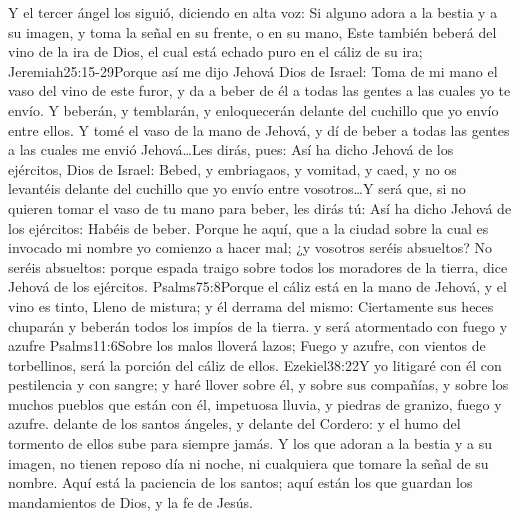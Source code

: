 Y el tercer ángel los siguió, diciendo en alta voz: Si alguno adora a la bestia y a su imagen, y toma la señal en su frente, o en su mano, 
Este también beberá del vino de la ira de Dios, el cual está echado puro en el cáliz de su ira;%
				   {Jeremiah}{25:15-29}{Porque así me dijo Jehová Dios de Israel: Toma de mi mano el vaso del vino de este furor, y da a beber de él a todas las gentes a las cuales yo te envío. Y beberán, y temblarán, y enloquecerán delante del cuchillo que yo envío entre ellos. Y tomé el vaso de la mano de Jehová, y dí de beber a todas las gentes a las cuales me envió Jehová\ldots Les dirás, pues: Así ha dicho Jehová de los ejércitos, Dios de Israel: Bebed, y embriagaos, y vomitad, y caed, y no os levantéis delante del cuchillo que yo envío entre vosotros\ldots Y será que, si no quieren tomar el vaso de tu mano para beber, les dirás tú: Así ha dicho Jehová de los ejércitos: Habéis de beber. Porque he aquí, que a la ciudad sobre la cual es invocado mi nombre yo comienzo a hacer mal; ¿y vosotros seréis absueltos? No seréis absueltos: porque espada traigo sobre todos los moradores de la tierra, dice Jehová de los ejércitos.}%
				   {Psalms}{75:8}{Porque el cáliz está en la mano de Jehová, y el vino es tinto, Lleno de mistura; y él derrama del mismo: Ciertamente sus heces chuparán y beberán todos los impíos de la tierra.}
 y será atormentado con fuego y azufre%
					{Psalms}{11:6}{Sobre los malos lloverá lazos; Fuego y azufre, con vientos de torbellinos, será la porción del cáliz de ellos.}%
					{Ezekiel}{38:22}{Y yo litigaré con él con pestilencia y con sangre; y haré llover sobre él, y sobre sus compañías, y sobre los muchos pueblos que están con él, impetuosa lluvia, y piedras de granizo, fuego y azufre.}%
 delante de los santos ángeles, y delante del Cordero: 
y el humo del tormento de ellos sube para siempre jamás.%
 Y los que adoran a la bestia y a su imagen, no tienen reposo día ni noche,%
 ni cualquiera que tomare la señal de su nombre. 
Aquí está la paciencia de los santos; aquí están los que guardan los mandamientos de Dios, y la fe de Jesús.

